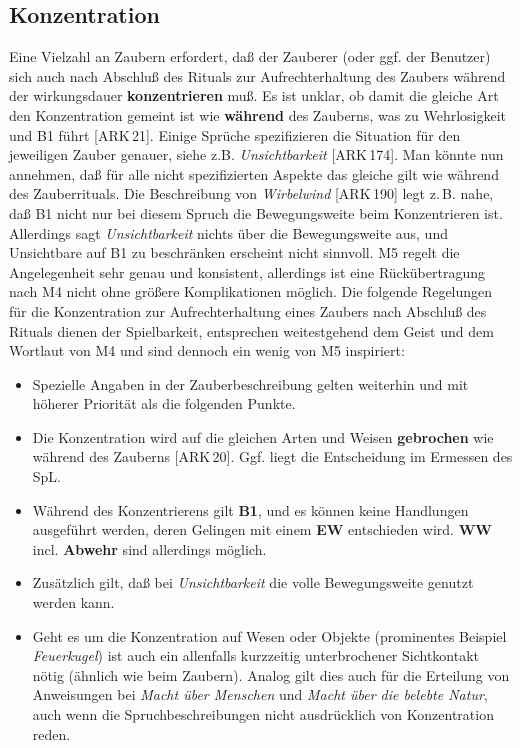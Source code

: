 \documentclass[10pt,a4paper,germanpar]{article}
\begin{document}
\subsection{Konzentration}

Eine Vielzahl an Zaubern erfordert, daß der Zauberer (oder ggf. der
Benutzer) sich auch nach Abschluß des Rituals zur Aufrechterhaltung
des Zaubers während der wirkungsdauer \textbf{konzentrieren} muß. Es
ist unklar, ob damit die gleiche Art den Konzentration gemeint ist wie
\textbf{während} des Zauberns, was zu Wehrlosigkeit und B1 führt
[ARK\,21]. Einige Sprüche spezifizieren die Situation für den
jeweiligen Zauber genauer, siehe z.B. \emph{Unsichtbarkeit}
[ARK\,174]. Man könnte nun annehmen, daß für alle nicht spezifizierten
Aspekte das gleiche gilt wie während des Zauberrituals. Die
Beschreibung von \emph{Wirbelwind} [ARK\,190] legt z.\,B. nahe, daß B1
nicht nur bei diesem Spruch die Bewegungsweite beim Konzentrieren
ist. Allerdings sagt \emph{Unsichtbarkeit} nichts über die
Bewegungsweite aus, und Unsichtbare auf B1 zu beschränken erscheint
nicht sinnvoll. M5 regelt die Angelegenheit sehr genau und konsistent,
allerdings ist eine Rückübertragung nach M4 nicht ohne größere
Komplikationen möglich. Die folgende Regelungen für die Konzentration
zur Aufrechterhaltung eines Zaubers nach Abschluß des Rituals dienen
der Spielbarkeit, entsprechen weitestgehend dem Geist und dem Wortlaut
von M4 und sind dennoch ein wenig von M5 inspiriert:

\begin{itemize}
\item Spezielle Angaben in der Zauberbeschreibung gelten
  weiterhin und mit höherer Priorität als die folgenden Punkte.
\item Die Konzentration wird auf die gleichen Arten und Weisen
  \textbf{gebrochen} wie während des Zauberns [ARK\,20]. Ggf. liegt
  die Entscheidung im Ermessen des SpL.
\item Während des Konzentrierens gilt \textbf{B1}, und es können keine
  Handlungen ausgeführt werden, deren Gelingen mit einem \textbf{EW}
  entschieden wird. \textbf{WW} incl. \textbf{Abwehr} sind allerdings
  möglich.
\item Zusätzlich gilt, daß bei \emph{Unsichtbarkeit} die volle
  Bewegungsweite genutzt werden kann.
\item Geht es um die Konzentration auf Wesen oder Objekte (prominentes
  Beispiel \emph{Feuerkugel}) ist auch ein allenfalls kurzzeitig
  unterbrochener Sichtkontakt nötig (ähnlich wie beim Zaubern). Analog
  gilt dies auch für die Erteilung von Anweisungen bei \emph{Macht
    über Menschen} und \emph{Macht über die belebte Natur}, auch wenn
  die Spruchbeschreibungen nicht ausdrücklich von Konzentration reden.
\end{itemize}
\end{document}
